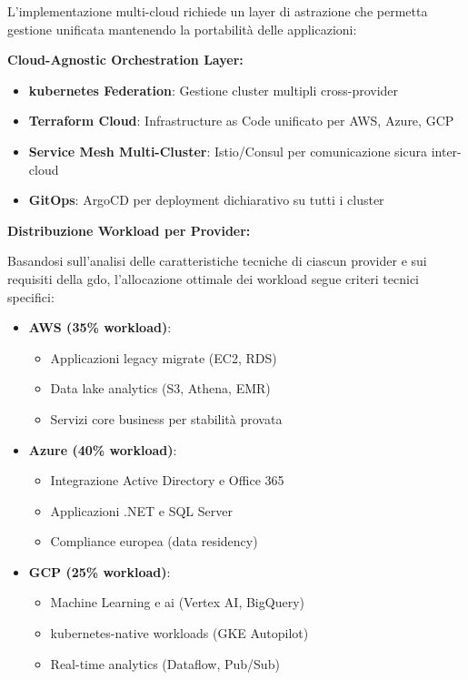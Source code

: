 L'implementazione multi-cloud richiede un layer di astrazione che permetta gestione unificata mantenendo la portabilità delle applicazioni:

\textbf{Cloud-Agnostic Orchestration Layer:}
\begin{itemize}
    \item \textbf{\gls{kubernetes} Federation}: Gestione cluster multipli cross-provider
    \item \textbf{Terraform Cloud}: Infrastructure as Code unificato per AWS, Azure, GCP
    \item \textbf{Service Mesh Multi-Cluster}: Istio/Consul per comunicazione sicura inter-cloud
    \item \textbf{GitOps}: ArgoCD per deployment dichiarativo su tutti i cluster
\end{itemize}

\textbf{Distribuzione Workload per Provider:}

Basandosi sull'analisi delle caratteristiche tecniche di ciascun provider e sui requisiti della \gls{gdo}, l'allocazione ottimale dei workload segue criteri tecnici specifici:

\begin{itemize}
    \item \textbf{AWS (35\% workload)}:
    \begin{itemize}
        \item Applicazioni legacy migrate (EC2, RDS)
        \item Data lake analytics (S3, Athena, EMR)
        \item Servizi core business per stabilità provata
    \end{itemize}
    
    \item \textbf{Azure (40\% workload)}:
    \begin{itemize}
        \item Integrazione Active Directory e Office 365
        \item Applicazioni .NET e SQL Server
        \item Compliance europea (data residency)
    \end{itemize}
    
    \item \textbf{GCP (25\% workload)}:
    \begin{itemize}
        \item Machine Learning e \gls{ai} (Vertex AI, BigQuery)
        \item \gls{kubernetes}-native workloads (GKE Autopilot)
        \item Real-time analytics (Dataflow, Pub/Sub)
    \end{itemize}
\end{itemize}

